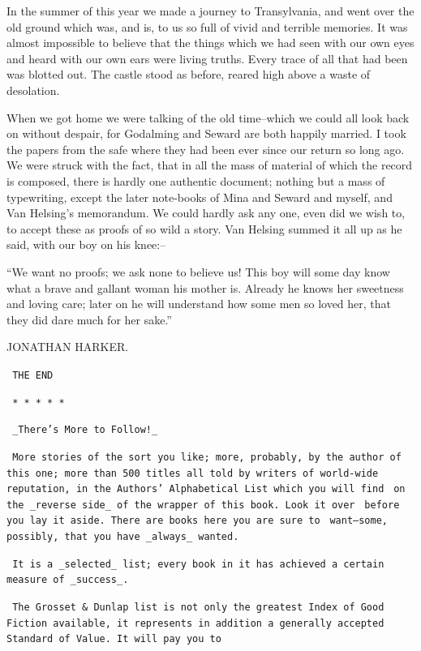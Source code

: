 \documentclass[12pt,openright]{book}
\begin{document}
In the summer of this year we made a journey to Transylvania, and went over the old ground which was, and is, to us so full of vivid and terrible memories. It was almost impossible to believe that the things which we had seen with our own eyes and heard with our own ears were living truths. Every trace of all that had been was blotted out. The castle stood as before, reared high above a waste of desolation.

When we got home we were talking of the old time–which we could all look back on without despair, for Godalming and Seward are both happily married. I took the papers from the safe where they had been ever since our return so long ago. We were struck with the fact, that in all the mass of material of which the record is composed, there is hardly one authentic document; nothing but a mass of typewriting, except the later note-books of Mina and Seward and myself, and Van Helsing’s memorandum. We could hardly ask any one, even did we wish to, to accept these as proofs of so wild a story. Van Helsing summed it all up as he said, with our boy on his knee:–

“We want no proofs; we ask none to believe us! This boy will some day know what a brave and gallant woman his mother is. Already he knows her sweetness and loving care; later on he will understand how some men so loved her, that they did dare much for her sake.”

JONATHAN HARKER.

\texttt{                            THE END}

\texttt{   *       *       *       *       *}

\texttt{                   \_There’s More to Follow!\_}

\texttt{ More stories of the sort you like; more, probably, by the author of}
\texttt{ this one; more than 500 titles all told by writers of world-wide}
\texttt{ reputation, in the Authors’ Alphabetical List which you will find}
\texttt{ on the \_reverse side\_ of the wrapper of this book. Look it over}
\texttt{ before you lay it aside. There are books here you are sure to}
\texttt{ want--some, possibly, that you have \_always\_ wanted.}

\texttt{ It is a \_selected\_ list; every book in it has achieved a certain}
\texttt{ measure of \_success\_.}

\texttt{ The Grosset \& Dunlap list is not only the greatest Index of Good}
\texttt{ Fiction available, it represents in addition a generally accepted}
\texttt{ Standard of Value. It will pay you to}
\end{document}
